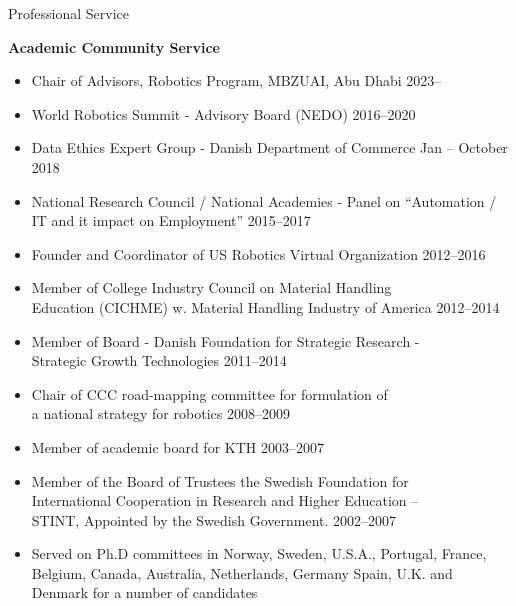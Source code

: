 \documentclass{article}
\begin{document}
\begin{cv}


\begin{cvlist}{Professional Service}%
\item {\bf Academic Community Service}
  \begin{itemize}
    \item Chair of Advisors, Robotics Program, MBZUAI, Abu Dhabi
          \cftdotfill{\cftdotsep} 2023--
  \item World Robotics Summit - Advisory Board (NEDO)
    \cftdotfill{\cftdotsep} 2016--2020
  \item Data Ethics Expert Group - Danish Department of Commerce
    \cftdotfill{\cftdotsep} Jan -- October 2018
  \item National Research Council / National Academies - Panel on
    ``Automation / IT and it impact on Employment''
    \cftdotfill{\cftdotsep} 2015--2017
  \item Founder and Coordinator of US Robotics Virtual Organization
    \cftdotfill{\cftdotsep} 2012--2016
  \item Member of College Industry Council on Material Handling\\
    Education (CICHME) w. Material Handling Industry of America
    \cftdotfill{\cftdotsep} 2012--2014
  \item Member of Board - Danish Foundation for Strategic Research -\\
    Strategic Growth Technologies \cftdotfill{\cftdotsep} 2011--2014
  \item Chair of CCC road-mapping committee for formulation of \\
    a national strategy for robotics \cftdotfill{\cftdotsep}
    2008--2009
  \item Member of academic board for KTH \cftdotfill{\cftdotsep}
    2003--2007
  \item Member of the Board of Trustees the Swedish Foundation for\\
    International Cooperation in Research and Higher Education --\\
    STINT, Appointed by the Swedish Government.
    \cftdotfill{\cftdotsep} 2002--2007
  \item Served on Ph.D committees in Norway, Sweden, U.S.A., Portugal,
    France, Belgium, Canada, Australia, Netherlands, Germany Spain,
    U.K. and Denmark for a number of candidates
  \end{itemize}


\end{cvlist}
\end{cv}
\end{document}
